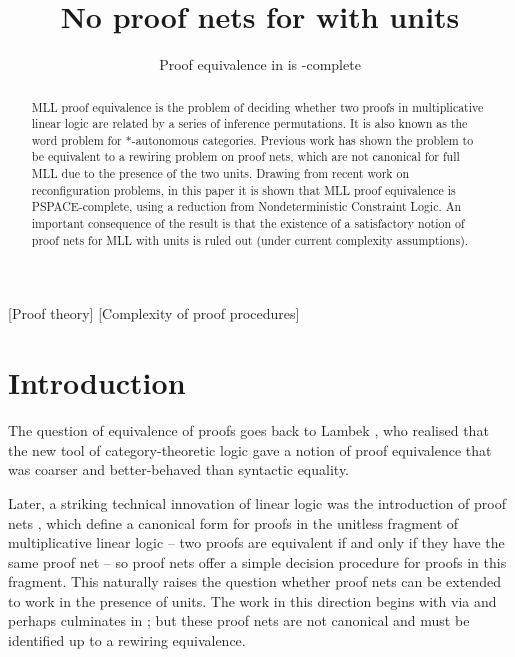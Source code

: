 \documentclass{sigplanconf-modified}
\title{No proof nets for \capsabbrev{mll} with units}
\subtitle{Proof equivalence in \capsabbrev{mll} is \capsabbrev{pspace}-complete}
\let\beforesection=\medskip
\let\aftersection=\noindent
\let\capsabbrev=\uppercase
\begin{document}
\maketitle


[Proof theory]
[Complexity of proof procedures]


\begin{abstract}
\capsabbrev{mll} proof equivalence is the problem of deciding whether two proofs in multiplicative linear logic are related by a series of inference permutations.
%
It is also known as the word problem for $*$-autonomous categories.
%
Previous work has shown the problem to be equivalent to a rewiring problem on proof nets, which are not canonical for full \capsabbrev{mll} due to the presence of the two units.
%
Drawing from recent work on reconfiguration problems, in this paper it is shown that \capsabbrev{mll} proof equivalence is \capsabbrev{pspace}-complete, using a reduction from Nondeterministic Constraint Logic.
%
An important consequence of the result is that the existence of a satisfactory notion of proof nets for \capsabbrev{mll} with units is ruled out (under current complexity assumptions).
\end{abstract}


\beforesection

\section{Introduction}

\aftersection
%
The question of equivalence of proofs goes back to Lambek \cite{Lambek-1968}, who realised that the new tool of category-theoretic logic gave a notion of proof equivalence that was coarser and better-behaved than syntactic equality.

Later, a striking technical innovation of linear logic was the introduction of proof nets \cite{Girard-1987,Danos-Regnier-1989}, which define a canonical form for proofs in the unitless fragment of multiplicative linear logic -- two proofs are equivalent if and only if they have the same proof net -- so proof nets offer a simple decision procedure for proofs in this fragment. This naturally raises the question whether proof nets can be extended to work in the presence of units. The work in this direction begins with \cite{Trimble-1994,Blute-Cockett-Seely-Trimble-1996} via \color{red}\cite{Lamarche-Strassburger-2006} \color{black} and perhaps culminates in \cite{HughesFreeStar,HughesMLLProofNets}; but these proof nets are not canonical and must be identified up to a rewiring equivalence.
\end{document}
